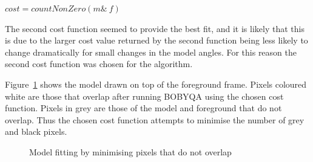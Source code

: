 \centerline{$cost = countNonZero(m \& ~f)$}

The second cost function seemed to provide the best fit, and it is likely that this is due to the larger cost value returned by the second function being less likely to change dramatically for small changes in the model angles. For this reason the second cost function was chosen for the algorithm.

Figure~\ref{fig:modeloverlap} shows the model drawn on top of the foreground frame. Pixels coloured white are those that overlap after running BOBYQA using the chosen cost function. Pixels in grey are those of the model and foreground that do not overlap. Thus the chosen cost function attempts to minimise the number of grey and black pixels.

\begin{figure}[H]
    \centering
\caption{Model fitting by minimising pixels that do not overlap}
\label{fig:modeloverlap}
\end{figure}


